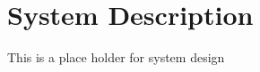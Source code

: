 



\chapter{ System Description} \label{cha:SystemDescription}
This is a place holder for system design